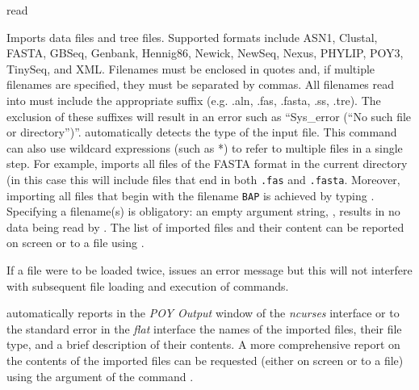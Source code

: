\begin{command}{read}{}


    \begin{poydescription} 
        Imports data files and tree files.  Supported formats include ASN1, Clustal,
        FASTA, GBSeq, Genbank, Hennig86, Newick, NewSeq, Nexus, PHYLIP, POY3, TinySeq,
        and XML. Filenames must be enclosed in quotes and, if multiple filenames
        are specified, they must be separated by commas. All filenames read into
        \poy must include the appropriate suffix (e.g. .aln, .fas, .fasta, .ss, .tre).
        The exclusion of these suffixes will result in an error such as 
        ``Sys\_error (``No such file or directory'')''.  
        automatically detects the type of the input file. This command can also
        use wildcard expressions (such as *) to refer to multiple files in a
        single step. For example,  imports all files
        of the FASTA format in the current directory (in this case this will
        include files that end in both \texttt{.fas} and \texttt{.fasta}.
        Moreover, importing all files that begin with the filename \texttt{BAP}
        is achieved by typing . Specifying a
        filename(s) is obligatory: an empty argument string,
        , results in no data being read by \poy. The list of
        imported files and their content can be reported on screen or to a file
        using .
        
        If a file were to be loaded twice, \poy issues an error message but this
        will not interfere with subsequent file loading and execution of
        commands.
        
       \poy automatically reports in the \emph{POY Output} window of the \emph{ncurses}
        interface or to the standard error in the \emph{flat} interface the names
        of the imported files, their file type, and a brief description of
        their contents. A more comprehensive report on the contents of the imported
        files can be requested (either on screen or to a file) using the argument
         of the command .
            
    \end{poydescription}

    \begin{arguments}


\end{arguments}
\end{command}
